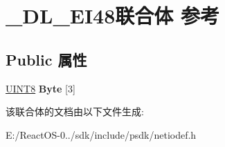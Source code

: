 \hypertarget{union___d_l___e_i48}{}\section{\+\_\+\+D\+L\+\_\+\+E\+I48联合体 参考}
\label{union___d_l___e_i48}
\subsection*{Public 属性}
\begin{DoxyCompactItemize}
\item 
\mbox{\label{union___d_l___e_i48_ab16f18345f8cb65fccdc4c0ab0bad4bc}} 
\hyperlink{_processor_bind_8h_ab27e9918b538ce9d8ca692479b375b6a}{U\+I\+N\+T8} {\bfseries Byte} \mbox{[}3\mbox{]}
\end{DoxyCompactItemize}


该联合体的文档由以下文件生成\+:\begin{DoxyCompactItemize}
\item 
E\+:/\+React\+O\+S-\/0../sdk/include/psdk/netiodef.\+h\end{DoxyCompactItemize}

